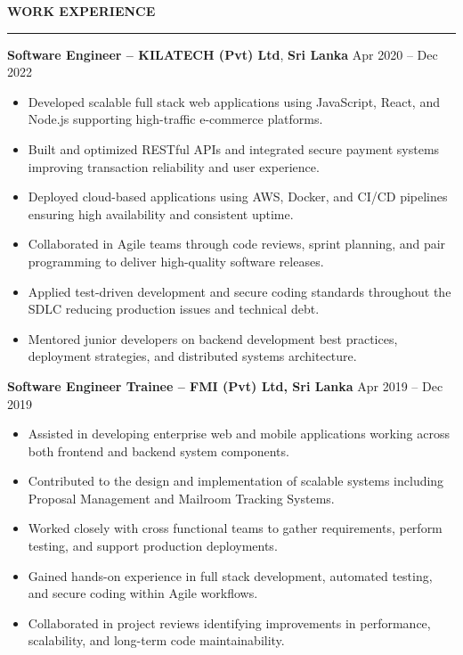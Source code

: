 \documentclass[10pt,letterpaper]{article}
\begin{document}
\vspace{8pt}

\textbf{WORK EXPERIENCE}\\[-8pt]
\noindent\rule{\textwidth}{1pt}

\vspace{-2pt}

\textbf{Software Engineer -- KILATECH (Pvt) Ltd}, \textbf{Sri Lanka} \hfill Apr 2020 -- Dec 2022

\vspace{-1pt}

\begin{itemize}
\item Developed scalable full stack web applications using JavaScript, React, and Node.js supporting high-traffic e-commerce platforms.
\item Built and optimized RESTful APIs and integrated secure payment systems improving transaction reliability and user experience.
\item Deployed cloud-based applications using AWS, Docker, and CI/CD pipelines ensuring high availability and consistent uptime.
\item Collaborated in Agile teams through code reviews, sprint planning, and pair programming to deliver high-quality software releases.
\item Applied test-driven development and secure coding standards throughout the SDLC reducing production issues and technical debt.
\item Mentored junior developers on backend development best practices, deployment strategies, and distributed systems architecture.
\end{itemize}

\textbf{Software Engineer Trainee -- FMI (Pvt) Ltd, Sri Lanka} \hfill Apr 2019 -- Dec 2019

\vspace{-1pt}

\begin{itemize}
\item Assisted in developing enterprise web and mobile applications working across both frontend and backend system components.
\item Contributed to the design and implementation of scalable systems including Proposal Management and Mailroom Tracking Systems.
\item Worked closely with cross functional teams to gather requirements, perform testing, and support production deployments.
\item Gained hands-on experience in full stack development, automated testing, and secure coding within Agile workflows.
\item Collaborated in project reviews identifying improvements in performance, scalability, and long-term code maintainability.
\end{itemize}
\end{document}
